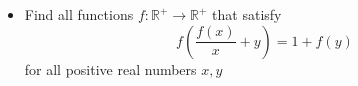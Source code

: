 \documentclass[11pt]{scrartcl}
\begin{document}
\begin{itemize}[label=,itemsep=0.4em,leftmargin=0em]
\begin{comment}
        However, from $(2)$ for $x \to \frac{a - b}{2} + \frac{2b}{a - b} + 1$ we get
        \[
        f\left(\frac{a - b}{2} + \frac{2a}{a - b} + 1\right) - f\left(\frac{a - b}{2} + \frac{2b}{a - b} + 1\right) = f(2) > 0
        \]
        This is absurd, so $f$ must be injective.

        Substituting $P(2,2x)$ we get 
        \[
            f\left(\frac{f(2x)}{2} + 1\right) = f(x + 3) - f(2), \xro
        \]
        But from $(2)$ we also have $f(x + 1 ) = f(x + 3) - f(2), \xro$. Thus, we get
        \[
            f\left(\frac{f(2x)}{2} + 1\right) = f(x + 1 ) \ra \frac{f(2x)}{2} + 1 = x + 1  \ra f(x) = cx, \xro
        \]
        Checking again, it satisfies. Therefore, the function that satisfies is $\boxed{f(x) = cx, \xro}$ with $c > 0$.

    \end{comment}
    
    \item \begin{btvn}
        Find all functions $f: \mathbb{R^+} \to \mathbb{R^+}$ that satisfy
        \[
        f\left(\frac{f(x)}{x}+y\right)=1+f(y) \tag{1}
        \]
        for all positive real numbers $x,y$
    \end{btvn}
    
    \begin{comment}
        Denote $P(x,y)$ as the substitution into $(1)$.

        \vocab{Method 1:}

        Let $\mathbb{T} = \left\{\frac{f(x)}{x} \mid x \in \mathbb{R^+}\right\}$. Suppose $\mathbb{T}$ takes more than one value. Let $t_1, t_2 \in \mathbb{T}$ such that $t_1 > t_2$. Then there exist $a_1, a_2 > 0$ such that $t_1 = \frac{f(a_1)}{a_1}, t_2 = \frac{f(a_2)}{a_2}$. From substituting $P(a_1,y)$ and $P(a_2,y)$ and comparing, we get 
        \[
            f(y + t_1) = f(y + t_2), \yro
        \]
        Replacing $y \to y - t_2$ and letting $\delta = t_1 - t_2 > 0$, we get $f(y) = f(y + \delta), \forall y > t_2$. By induction, it is easy to prove that 
        \[f(y) = f(y + n\delta), \forall y > t_2, n \in \mathbb{Z^+} \tag{2}\]
        
        On the other hand, substituting $P(x, \frac{f(x)}{x} + y)$ we get 
        \[
            f\left(2\frac{f(x)}{x}+y\right)=2+f(y), \xyro
        \]
        Also by induction, we can prove that 
        \[
            f\left(n\frac{f(x)}{x}+y\right)=n+f(y), \xyro \tag{3}
        \]
        From $(3)$, substituting $P(1,x - nf(1))$ we get 
        \[
            f(x) = n + f(x - nf(1)) > n ,\forall x > nf(1)
        \]
        At this point, choose $n_0 > \left\lfloor \frac{f(1)n}{\delta} \right\rfloor$, and from $(3)$ for $n = n_0$ we get $f(x) = f(x + n_0\delta) > n, \forall x > t_2$. As $n \to +\infty$ and $x$ is fixed (since $x$ does not depend on $n$), then $f(x) \to +\infty$, which is absurd. 


\end{comment}
\end{itemize}
\end{document}
